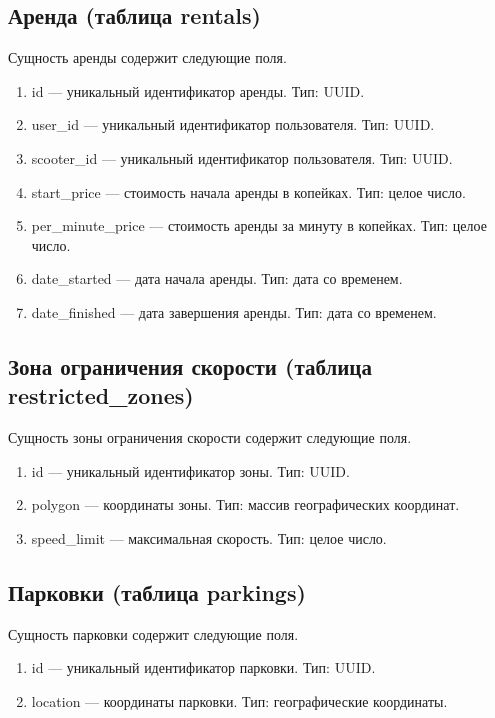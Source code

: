 \subsection{Аренда (таблица rentals)}

Сущность аренды содержит следующие поля.

\begin{enumerate}
    \item id --- уникальный идентификатор аренды. Тип: UUID.
    \item user\_id --- уникальный идентификатор пользователя. Тип: UUID.
    \item scooter\_id --- уникальный идентификатор пользователя. Тип: UUID.
    \item start\_price --- стоимость начала аренды в копейках. Тип: целое число.
    \item per\_minute\_price --- стоимость аренды за минуту в копейках. Тип: целое число.
    \item date\_started --- дата начала аренды. Тип: дата со временем.
    \item date\_finished --- дата завершения аренды. Тип: дата со временем.
\end{enumerate}

\subsection{Зона ограничения скорости (таблица restricted\_zones)}

Сущность зоны ограничения скорости содержит следующие поля.

\begin{enumerate}
    \item id --- уникальный идентификатор зоны. Тип: UUID. 
    \item polygon --- координаты зоны. Тип: массив географических координат.
    \item speed\_limit --- максимальная скорость. Тип: целое число.
\end{enumerate}

\subsection{Парковки (таблица parkings)}

Сущность парковки содержит следующие поля.

\begin{enumerate}
    \item id --- уникальный идентификатор парковки. Тип: UUID.
    \item location --- координаты парковки. Тип: географические координаты.
\end{enumerate}

